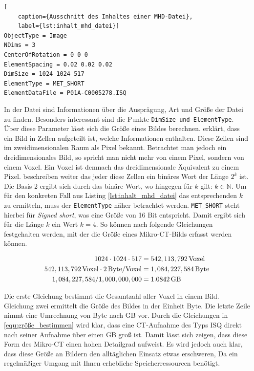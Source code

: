 \begin{lstlisting}[
	caption={Ausschnitt des Inhaltes einer MHD-Datei},
	label={lst:inhalt_mhd_datei}]
ObjectType = Image
NDims = 3
CenterOfRotation = 0 0 0
ElementSpacing = 0.02 0.02 0.02
DimSize = 1024 1024 517
ElementType = MET_SHORT
ElementDataFile = P01A-C0005278.ISQ
\end{lstlisting}

In der Datei sind Informationen über die Ausprägung, Art und Größe der Datei zu finden.
Besonders interessant sind die Punkte \texttt{DimSize und ElementType}. Über
diese Parameter lässt sich die Größe eines Bildes berechnen. \citet[S.~10-11]{burger2009}
erklärt, dass ein Bild in Zellen aufgeteilt ist, welche Informationen enthalten.
Diese Zellen sind im zweidimensionalen Raum als Pixel bekannt. Betrachtet man
jedoch ein dreidimensionales Bild, so spricht man nicht mehr von einem Pixel,
sondern von einem Voxel. Ein Voxel ist demnach das dreidimensionale Äquivalent zu
einem Pixel. \citet[S.~10-11]{burger2009} beschreiben weiter das jeder diese Zellen
ein binäres Wort der Länge $2^{k}$ ist. Die Basis 2 ergibt sich durch das binäre
Wort, wo hingegen für $k$ gilt: $k \in \mathbb{N}$. Um für den konkreten Fall aus
Listing \ref{lst:inhalt_mhd_datei} das entsprechenden $k$ zu ermitteln, muss der
\texttt{ElementType} näher betrachtet werden. \texttt{MET\_SHORT} steht hierbei für
\textit{Signed short}, was eine Größe von 16 Bit entspricht. Damit ergibt sich
für die Länge $k$ ein Wert $k = 4$. So können nach \citet[S.~10-11]{burger2009}
folgende Gleichungen festgehalten werden, mit der die Größe eines Mikro-\ac{CT}-Bilds
erfasst werden können.

\begin{align}
	\label{equ:größe_bestimmen}1024 \cdot 1024 \cdot 517    & = 542,113,792 \, \text{Voxel}\notag  \\
	542,113,792 \, \text{Voxel}\cdot 2 \, \text{Byte/Voxel} & = 1,084,227,584 \, \text{Byte}\notag \\
	1,084,227,584 / 1,000,000,000                           & = 1.0842 \, \text{GB}
\end{align}

Die erste Gleichung bestimmt die Gesamtzahl aller Voxel in einem Bild. Gleichung
zwei ermittelt die Größe des Bildes in der Einheit Byte. Die letzte Zeile nimmt eine
Umrechnung von Byte nach \ac{GB} vor. Durch die Gleichungen in \ref{equ:größe_bestimmen}
wird klar, dass eine \ac{CT}-Aufnahme des Typs \ac{ISQ} direkt nach seiner
Aufnahme über einen \ac{GB} groß ist. Damit lässt sich zeigen, dass diese Form des
Mikro-\ac{CT} einen hohen Detailgrad aufweist. Es wird jedoch auch klar, dass
diese Größe an Bildern den alltäglichen Einsatz etwas erschweren, Da ein regelmäßiger
Umgang mit Ihnen erhebliche Speicherressourcen benötigt.

